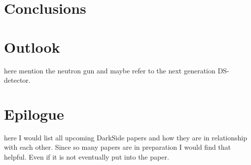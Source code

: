 \section{Conclusions}\label{sec:Conclusions}
\section{Outlook}\label{sec:Outlook}
here mention the neutron gun and maybe refer to the next generation DS-detector.
\section{Epilogue}\label{sec:Epilogue}
here I would list all upcoming DarkSide papers and how they are in relationship with each other. Since so many papers are in preparation I would find that helpful. Even if it is not eventually put into the paper.